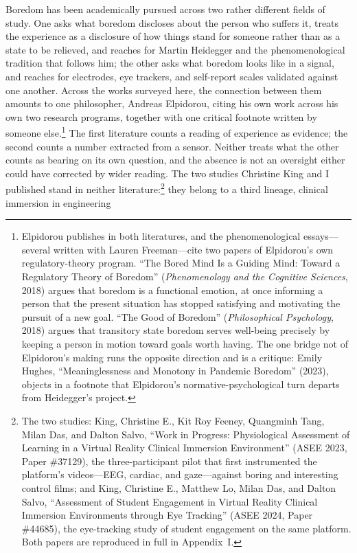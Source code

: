 Boredom has been academically pursued across two rather different fields of study. One asks
what boredom discloses about the person who suffers it, treats the experience as a disclosure
of how things stand for someone rather than as a state to be relieved, and reaches for Martin
Heidegger and the phenomenological tradition that follows him; the other asks what boredom
looks like in a signal, and reaches for electrodes, eye trackers, and self-report scales
validated against one another. Across the works surveyed here, the connection between them
amounts to one philosopher, Andreas Elpidorou, citing his own work across his own two research
programs, together with one critical footnote written by someone else.\footnote{Elpidorou
publishes in both literatures, and the phenomenological essays---several written with Lauren
Freeman---cite two papers of Elpidorou's own regulatory-theory program. ``The Bored Mind Is a
Guiding Mind: Toward a Regulatory Theory of Boredom'' (\textit{Phenomenology and the Cognitive
Sciences}, 2018) argues that boredom is a functional emotion, at once informing a person that
the present situation has stopped satisfying and motivating the pursuit of a new goal. ``The
Good of Boredom'' (\textit{Philosophical Psychology}, 2018) argues that transitory state
boredom serves well-being precisely by keeping a person in motion toward goals worth having.
The one bridge not of Elpidorou's making runs the opposite direction and is a critique:
Emily Hughes, ``Meaninglessness and Monotony in Pandemic Boredom'' (2023), objects in a footnote
that Elpidorou's normative-psychological turn departs from Heidegger's project.} The first
literature counts a reading of experience
as evidence; the second counts a number extracted from a sensor. Neither treats what the
other counts as bearing on its own question, and the absence is not an oversight either could
have corrected by wider reading. The two studies Christine King and I published stand in
neither literature:\footnote{The two studies: King, Christine E., Kit Roy Feeney, Quangminh
Tang, Milan Das, and Dalton Salvo, ``Work in Progress: Physiological Assessment of Learning
in a Virtual Reality Clinical Immersion Environment'' (ASEE 2023, Paper \#37129), the
three-participant pilot that first instrumented the platform's videos---EEG, cardiac, and
gaze---against boring and interesting control films; and King, Christine E., Matthew Lo, Milan Das, and
Dalton Salvo, ``Assessment of Student Engagement in Virtual Reality Clinical Immersion
Environments through Eye Tracking'' (ASEE 2024, Paper \#44685), the eye-tracking study of
student engagement on the same platform. Both papers are reproduced in
full in Appendix~I.} they belong to a third lineage, clinical immersion in engineering
